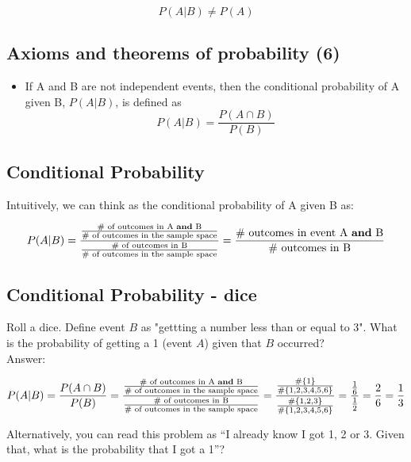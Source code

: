 \documentclass[11pt]{article}
\begin{document}
	\[P(A|B) \neq P(A)\]
	
	\subsection*{Axioms and theorems of probability (6)}
	\begin{itemize}
		\item If A and B are not independent events, then the conditional probability of A given B, $P(A|B)$, is defined as
	\[P(A|B) = \frac{P(A\cap B)}{P(B)}\]
 
	\end{itemize}

	\subsection*{Conditional Probability}
	Intuitively, we can think as the conditional probability of A given B as:

		\[P(A|B) = \frac{
						\frac{
							\text{\# of outcomes in A \textbf{and} B}
							}
							{\text{\# of outcomes in the sample space}
							}
						}
						{
						\frac{
							\text{\# of outcomes in B}
							}
							{\text{\# of outcomes in the sample space}
							}
						}
		=\frac{\text{\# outcomes in event A \textbf{and} B}}
							{\text{\# outcomes in B}
							}\]



	\subsection*{Conditional Probability - dice}
	
	Roll a dice. Define event $B$ as "gettting a number less than or equal to 3". What is the probability of getting a 1 (event $A$) given that $B$ occurred?\\
	 
	Answer:

	\[P(A|B) = \frac{P(A\cap B)}{P(B)} = 
	\frac{
						\frac{
							\text{\# of outcomes in A \textbf{and} B}
							}
							{\text{\# of outcomes in the sample space}
							}
						}
						{
						\frac{
							\text{\# of outcomes in B}
							}
							{\text{\# of outcomes in the sample space}
							}
						} =
						\frac
							{\frac{\#\{1\}}{\#\{1,2,3,4,5,6\}}}
							{\frac{\#\{1,2,3\}}{\#\{1,2,3,4,5,6\}}} = 
							\frac{\frac{1}{6}}{\frac{1}{2}} = \frac{2}{6} = \frac{1}{3}\]
	
	Alternatively, 	you can read this problem as ``I already know I got 1, 2 or 3. Given that, what is the probability that I got a 1''?
\end{document}
